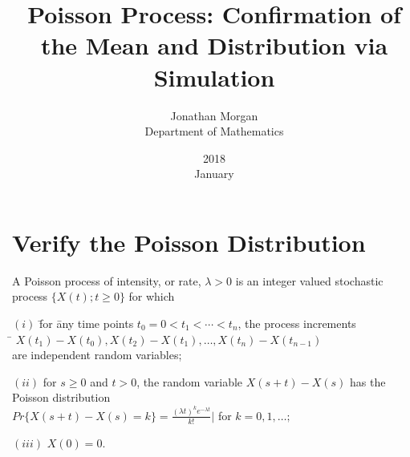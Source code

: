 \documentclass{article}
\title{Poisson Process: Confirmation of the Mean and Distribution via Simulation}
\date{2018\\ January}
\author{Jonathan Morgan\\ Department of Mathematics}
\begin{document}
\maketitle
\pagebreak
\section{Verify the Poisson Distribution \newline}

A Poisson process of intensity, or rate, $\lambda > 0$ is an integer valued stochastic process $\{X(t); t\geq0\}$ for which


\begin{tabbing}

$(i)$ \= for \= any time points $t_{0}= 0 < t_{1} < \cdots < t_{n}$, the process increments\newline \\

\> \> \= $X(t_{1}) - X(t_{0}), X(t_{2}) - X(t_{1}), \ldots , X(t_{n}) - X(t_{n - 1})$ \\ \newline
\> are independent random variables; \\ \newline

$(ii)$ for $s \geq 0$ and $t > 0$, the random variable $X(s+t) - X(s)$ has the \\
\> Poisson distribution \\ 
\> \> $Pr\{X(s + t) - X(s) = k\} = \frac{(\lambda t)^{k} e^{-\lambda t}}{k!} |$ for $ k = 0, 1, \ldots;$ \\ \newline

$(iii)$ $X(0) = 0.$
\end{tabbing}
\end{document}
